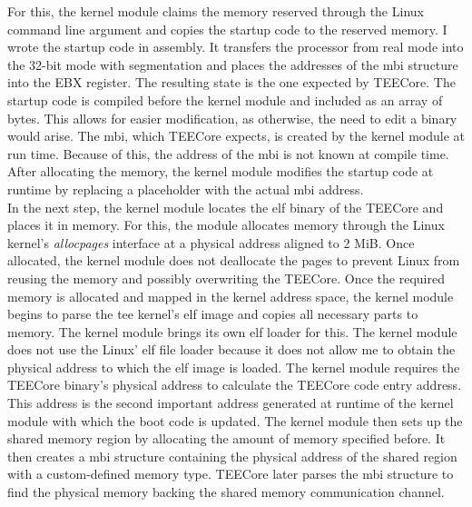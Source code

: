 For this, the kernel module claims the memory reserved through the Linux command
line argument and copies the startup code to the reserved memory. I wrote the
startup code in assembly. It transfers the processor from real mode into the
32-bit mode with segmentation and places the addresses of the \gls{mbi}
structure into the EBX register. The resulting state is the one expected by
TEECore. The startup code is compiled before the kernel module and included as
an array of bytes. This allows for easier modification, as otherwise, the need
to edit a binary would arise. The \gls{mbi}, which TEECore expects, is created
by the kernel module at run time. Because of this, the address of the \gls{mbi}
is not known at compile time. After allocating the memory, the kernel module
modifies the startup code at runtime by replacing a placeholder with the actual
\gls{mbi} address.\\

In the next step, the kernel module locates the \gls{elf} binary of the TEECore
and places it in memory. For this, the module allocates memory through the Linux
kernel's \textit{allocpages} interface at a physical address aligned to 2 MiB.
Once allocated, the kernel module does not deallocate the pages to prevent Linux
from reusing the memory and possibly overwriting the TEECore. Once the required
memory is allocated and mapped in the kernel address space, the kernel module
begins to parse the \gls{tee} kernel's \gls{elf} image and copies all necessary
parts to memory. The kernel module brings its own \gls{elf} loader for this. The
kernel module does not use the Linux' \gls{elf} file loader because it does not
allow me to obtain the physical address to which the \gls{elf} image is
loaded. The kernel module requires the TEECore binary's physical address to
calculate the TEECore code entry address. This address is the second important
address generated at runtime of the kernel module with which the boot code is
updated. The kernel module then sets up the shared memory region by allocating
the amount of memory specified before. It then creates a \gls{mbi} structure
containing the physical address of the shared region with a custom-defined
memory type. TEECore later parses the \gls{mbi} structure to find the physical
memory backing the shared memory communication channel.\\

